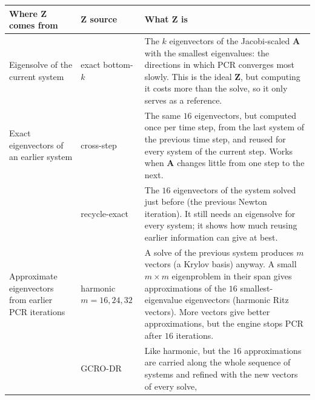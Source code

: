 \begin{table}[h]
  \centering
  \small
  \setlength{\extrarowheight}{2pt}
  \begin{tabular}{|>{\raggedright\arraybackslash}p{2.5cm}|>{\raggedright\arraybackslash}p{3.1cm}|>{\raggedright\arraybackslash}p{8.6cm}|}
    \hline
    Where $\mathbf{Z}$ comes from & $\mathbf{Z}$ source & What $\mathbf{Z}$ is \\
    \hline
    Eigensolve of the current system
      & exact bottom-$k$
      & The $k$ eigenvectors of the Jacobi-scaled $\mathbf{A}$ with the smallest
        eigenvalues: the directions in which PCR converges most slowly. This is
        the ideal $\mathbf{Z}$, but computing it costs more than the solve, so it
        only serves as a reference. \\
    \hline
    Exact eigenvectors of an earlier system
      & cross-step
      & The same $16$ eigenvectors, but computed once per time step, from the
        last system of the previous time step, and reused for every system of
        the current step. Works when $\mathbf{A}$ changes little from one step
        to the next. \\
    \cline{2-3}
      & recycle-exact
      & The $16$ eigenvectors of the system solved just before (the previous
        Newton iteration). It still needs an eigensolve for every system; it
        shows how much reusing earlier information can give at best. \\
    \hline
    Approximate eigenvectors from earlier PCR iterations
      & harmonic $m{=}16, 24, 32$
      & A solve of the previous system produces $m$ vectors (a Krylov basis)
        anyway. A small $m \times m$ eigenproblem in their span gives
        approximations of the $16$ smallest-eigenvalue eigenvectors (harmonic
        Ritz vectors). More vectors give better approximations, but the
        engine stops PCR after $16$ iterations. \\
    \cline{2-3}
      & GCRO-DR
      & Like harmonic, but the $16$ approximations are carried along the whole
        sequence of systems and refined with the new vectors of every solve,

\end{tabular}
\end{table}
